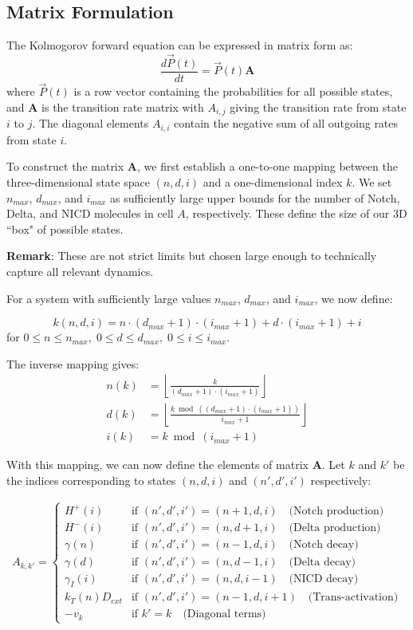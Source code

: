 \documentclass{article}
\begin{document}
\begin{flushleft}
\subsection*{Matrix Formulation}
The Kolmogorov forward equation can be expressed in matrix form as:
\[
\frac{d\vec{P}(t)}{dt} = \vec{P}(t)\mathbf{A}
\]
where $\vec{P}(t)$ is a row vector containing the probabilities for all possible states, and $\mathbf{A}$ is the transition rate matrix with $A_{i,j}$ giving the transition rate from state $i$ to $j$. The diagonal elements $A_{i,i}$ contain the negative sum of all outgoing rates from state $i$.

To construct the matrix $\mathbf{A}$, we first establish a one-to-one mapping between the three-dimensional state space $(n,d,i)$ and a one-dimensional index $k$. We set $n_{max}$, $d_{max}$, and $i_{max}$ as sufficiently large upper bounds for the number of Notch, Delta, and NICD molecules in cell $A$, respectively.  These define the size of our 3D ``box" of possible states. 

\textbf{Remark}: These are not strict limits but chosen large enough to technically capture all relevant dynamics.

For a system with sufficiently large values $n_{max}$, $d_{max}$, and $i_{max}$, we now define:

\[
k(n,d,i) = n \cdot (d_{max}+1) \cdot (i_{max}+1) + d \cdot (i_{max}+1) + i
\]
for $0 \leq n \leq n_{max}, \; 0 \leq d \leq d_{max}, \; 0 \leq i \leq i_{max}$.

The inverse mapping gives:
\begin{align*}
n(k) &= \left\lfloor \frac{k}{(d_{max}+1) \cdot (i_{max}+1)} \right\rfloor \\
d(k) &= \left\lfloor \frac{k \bmod ((d_{max}+1) \cdot (i_{max}+1))}{i_{max}+1} \right\rfloor \\
i(k) &= k \bmod (i_{max}+1)
\end{align*}

With this mapping, we can now define the elements of matrix $\mathbf{A}$. Let $k$ and $k'$ be the indices corresponding to states $(n,d,i)$ and $(n',d',i')$ respectively:

\begin{align*}
A_{k,k'} = 
\begin{cases}
H^+(i) & \text{if } (n',d',i') = (n+1,d,i) \quad \text{(Notch production)} \\
H^-(i) & \text{if } (n',d',i') = (n,d+1,i) \quad \text{(Delta production)} \\
\gamma(n) & \text{if } (n',d',i') = (n-1,d,i) \quad \text{(Notch decay)} \\
\gamma(d) & \text{if } (n',d',i') = (n,d-1,i) \quad \text{(Delta decay)} \\
\gamma_I(i) & \text{if } (n',d',i') = (n,d,i-1) \quad \text{(NICD decay)} \\
k_T(n)D_{ext} & \text{if } (n',d',i') = (n-1,d,i+1) \quad \text{(Trans-activation)} \\
-v_k & \text{if } k' = k \quad \text{(Diagonal terms)}
\end{cases}
\end{align*}


\end{flushleft}
\end{document}
